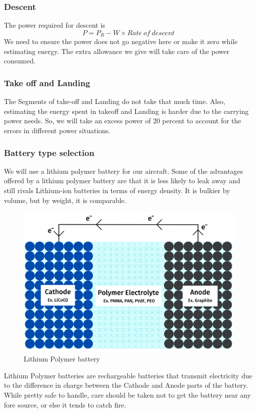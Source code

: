 \documentclass[12 pt]{article}
\begin{document}
\subsubsection{Descent}
The power required for descent is 
$$ P = P_R - W \times Rate\: of\: descent$$
We need to ensure the power does not go negative here or make it zero while estimating energy. The extra allowance we give will take care of the power consumed.

\subsubsection{Take off and Landing}
The Segments of take-off and Landing do not take that much time. Also, estimating the energy spent in takeoff and Landing is harder due to the carrying power needs. So, we will take an excess power of 20 percent to account for the errors in different power situations.

\subsubsection{Battery type selection \cite{Lipobattery}}
We will use a lithium polymer battery for our aircraft. Some of the advantages offered by a lithium polymer battery are that it is less likely to leak away and still rivals Lithium-ion batteries in terms of energy density. It is bulkier by volume, but by weight, it is comparable.

\begin{figure}[h]
    \centering
    \includegraphics[width=0.5\linewidth]{Extra pics/LiPo_battery_diagram.png}
    \caption{Lithium Polymer battery}
    \label{Lithium Polymer battery}
\end{figure}

Lithium Polymer batteries are rechargeable batteries that transmit electricity due to the difference in charge between the Cathode and Anode parts of the battery. While pretty safe to handle, care should be taken not to get the battery near any fore source, or else it tends to catch fire.
\end{document}
